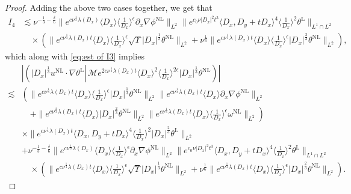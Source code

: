 \documentclass[reqno, 12pt]{amsart} %
\theoremstyle{plain} %
\theoremstyle{definition}
\theoremstyle{remark}
\numberwithin{equation}{section} %
\newcommand{\lt}{\left}
\newcommand{\rt}{\right}
\begin{document}
\begin{proof}
		Adding the above two cases together, we get that
		$$
		\begin{aligned}
			I_4 &\lesssim \nu^{-\frac{1}{3}-\frac{\delta}{6}}\|e^{c \nu^{\frac{1}{3}} \lambda\left(D_x\right)}\langle D_x\rangle\langle\frac{1}{D_x}\rangle^\epsilon \partial_x \nabla \phi^{\mathrm{NL}}\|_{L^2}\|e^{c_0 \nu\left|D_x\right|^2 t^3}\langle D_x, D_y+t D_x\rangle^4\langle\frac{1}{D_x}\rangle^2 \theta^{\mathrm{L}}\|_{L^1 \cap L^2} \\
			&\quad  \times\left(\|e^{c \nu^{\frac{1}{3}} \lambda\left(D_x\right) t}\langle D_x\rangle\langle\frac{1}{D_x}\rangle^\epsilon \sqrt{\Upsilon} |D_x|^\frac13  \theta^{\mathrm{NL}}\|_{L^2}+\nu^{\frac{1}{6}}\|e^{c \nu^{\frac{1}{3}} \lambda\left(D_x\right) t}\langle D_x\rangle\langle\frac{1}{D_x}\rangle^\epsilon\left|D_x\right|^{\frac{2}{3}} \theta^{\mathrm{NL}}\|_{L^2}\right), 
		\end{aligned}
		$$
		which along with \eqref{eq:est of I3} implies
		\begin{align*}
			&\left|\left( |D_x|^\frac13 u^{\mathrm{NL}} \cdot \nabla  \theta^{\mathrm{L}} \left\lvert\, \mathcal{M} e^{2 c \nu^{\frac{1}{3}} \lambda\left(D_x\right) t}\langle D_x\rangle^2\langle\frac{1}{D_x}\rangle^{2 \epsilon} |D_x|^\frac13 \theta^{\mathrm{NL}}\right.\right)\right|\\
			\lesssim & \lt( \|e^{c \nu^{\frac{1}{3}} \lambda\left(D_x\right) t}\langle D_x\rangle\langle\frac{1}{D_x}\rangle^\epsilon |D_x|^\frac13 \theta^{\mathrm{NL}}\|_{L^2}\|e^{c \nu^{\frac{1}{3}} \lambda\left(D_x\right) t}\langle D_x\rangle \partial_x \nabla \phi^{\mathrm{NL}}\|_{L^2} \rt. \\
			& \lt. \quad +\|e^{c \nu^{\frac{2}{3}} \lambda\left(D_x\right) t}\langle D_x\rangle\left|D_x\right|^{\frac{2}{3}} \theta^{\mathrm{NL}}\|_{L^2}\|e^{c \nu^{\frac{1}{3}} \lambda\left(D_x\right) t}\langle D_x\rangle\langle\frac{1}{D_x}\rangle^\epsilon \omega^{\mathrm{NL}}\|_{L^2} \rt)\\
			& \times\|e^{c \nu^{\frac{1}{3}} \lambda\left(D_x\right) t}\langle D_x, D_y+t D_x\rangle^4\langle\frac{1}{D_x}\rangle^2\left|D_x\right|^{\frac{2}{3}} \theta^{\mathrm{L}}\|_{L^2} \\
			& + \nu^{-\frac{1}{3}-\frac{\delta}{6}}\|e^{c \nu^{\frac{1}{3}} \lambda\left(D_x\right)}\langle D_x\rangle\langle\frac{1}{D_x}\rangle^\epsilon \partial_x \nabla \phi^{\mathrm{NL}}\|_{L^2}\|e^{c_0 \nu\left|D_x\right|^2 t^3}\langle D_x, D_y+t D_x\rangle^4\langle\frac{1}{D_x}\rangle^2 \theta^{\mathrm{L}}\|_{L^1 \cap L^2} \\
			& \quad \times\left(\|e^{c \nu^{\frac{1}{3}} \lambda\left(D_x\right) t}\langle D_x\rangle\langle\frac{1}{D_x}\rangle^\epsilon \sqrt{\Upsilon} |D_x|^\frac13  \theta^{\mathrm{NL}}\|_{L^2}+\nu^{\frac{1}{6}}\|e^{c \nu^{\frac{1}{3}} \lambda\left(D_x\right) t}\langle D_x\rangle\langle\frac{1}{D_x}\rangle^\epsilon\left|D_x\right|^{\frac{2}{3}} \theta^{\mathrm{NL}}\|_{L^2}\right).
		\end{align*}
		

\end{proof}
\end{document}
